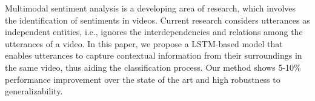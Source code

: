 Multimodal sentiment analysis is a developing area of research, which involves the identification of sentiments in videos. Current research considers utterances as independent entities, i.e., ignores the interdependencies and relations among the utterances of a video. In this paper, we propose a LSTM-based model that enables utterances to capture contextual information from their surroundings in the same video, thus aiding the classification process. Our method shows 5-10\% performance improvement over the state of the art and high robustness to generalizability.
